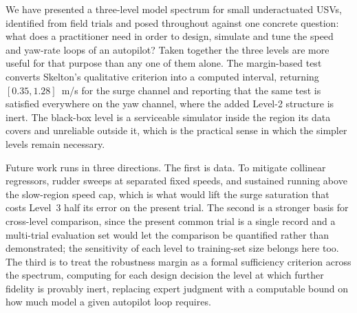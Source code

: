 \documentclass[conference]{IEEEtran}
\begin{document}
We have presented a three-level model spectrum for small underactuated USVs, identified from field trials and posed throughout against one concrete question: what does a practitioner need in order to design, simulate and tune the speed and yaw-rate loops of an autopilot? Taken together the three levels are more useful for that purpose than any one of them alone. The margin-based test converts Skelton's qualitative criterion into a computed interval, returning $[0.35, 1.28]$~m/s for the surge channel and reporting that the same test is satisfied everywhere on the yaw channel, where the added Level-2 structure is inert. The black-box level is a serviceable simulator inside the region its data covers and unreliable outside it, which is the practical sense in which the simpler levels remain necessary.

Future work runs in three directions. The first is data. To mitigate collinear regressors, rudder sweeps at separated fixed speeds, and sustained running above the slow-region speed cap, which is what would lift the surge saturation that costs Level~3 half its error on the present trial. The second is a stronger basis for cross-level comparison, since the present common trial is a single record and a multi-trial evaluation set would let the comparison be quantified rather than demonstrated; the sensitivity of each level to training-set size belongs here too. The third is to treat the robustness margin as a formal sufficiency criterion across the spectrum, computing for each design decision the level at which further fidelity is provably inert, replacing expert judgment with a computable bound on how much model a given autopilot loop requires.



\end{document}
